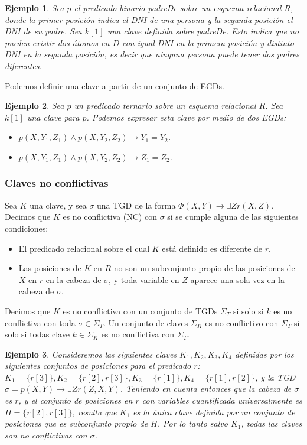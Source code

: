 \documentclass[11pt,a4paper,twoside]{tesis}
\newtheorem{exmp}{Ejemplo}
\begin{document}
\begin{exmp}
Sea $p$ el predicado binario \textit{padreDe} sobre un esquema relacional $R$, donde la primer posición indica el DNI de una persona y la segunda posición el DNI de su padre. Sea $k[1]$ una clave definida sobre \textit{padreDe}. Esto indica que no pueden existir dos átomos en $D$ con igual DNI en la primera posición y distinto DNI en la segunda posición, es decir que ninguna persona puede tener dos padres diferentes.
\end{exmp}

Podemos definir una clave a partir de un conjunto de EGDs.
\begin{exmp}
Sea $p$ un predicado ternario sobre un esquema relacional $R$. Sea $k[1]$ una clave para $p$. Podemos expresar esta clave por medio de dos EGDs:
\begin{itemize}
    \item $p(X, Y_1, Z_1) \land p(X, Y_2, Z_2) \rightarrow Y_1 = Y_2$.
    \item $p(X, Y_1, Z_1) \land p(X, Y_2, Z_2) \rightarrow Z_1 = Z_2$.
\end{itemize}
\end{exmp}


\subsubsection{Claves no conflictivas}
Sea $K$ una clave, y sea $\sigma$ una TGD de la forma $\Phi(X, Y) \rightarrow \exists Z r(X, Z)$. Decimos que $K$ es no conflictiva (NC) con $\sigma$ si se cumple alguna de las siguientes condiciones:
\begin{itemize}
    \item El predicado relacional sobre el cual $K$ está definido es diferente de $r$.
    \item Las posiciones de $K$ en $R$ no son un subconjunto propio de las posiciones de $X$ en $r$ en la cabeza de $\sigma$, y toda variable en $Z$ aparece una sola vez en la cabeza de $\sigma$. 
\end{itemize}

Decimos que $K$ es no conflictiva con un conjunto de TGDs $\Sigma_T$ si solo si $k$ es no conflictiva con toda $\sigma \in \Sigma_T$. Un conjunto de claves $\Sigma_K$ es no conflictivo con $\Sigma_T$ si solo si todas clave $k \in \Sigma_K$ es no conflictiva con $\Sigma_T$.

\begin{exmp}
Consideremos las siguientes claves $K_1, K_2, K_3, K_4$ definidas por los siguientes conjuntos de posiciones para el predicado $r$: $K_1=\{r[3]\}, K_2=\{r[2], r[3]\}, K_3=\{r[1]\},  K_4=\{r[1], r[2]\}$, y la TGD $\sigma = p(X, Y) \rightarrow \exists Z r(Z, X, Y)$. Teniendo en cuenta entonces que la cabeza de $\sigma$ es $r$, y el conjunto de posiciones en $r$ con variables cuantificada universalmente es $H = \{r[2], r[3]\}$, resulta que $K_1$ es la única clave definida por un conjunto de posiciones que es subconjunto propio de $H$. Por lo tanto salvo $K_1$, todas las claves son no conflictivas con $\sigma$.
\end{exmp}
\end{document}

